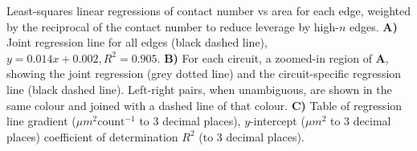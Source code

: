 Least-squares linear regressions of contact number vs area for each edge, weighted by the reciprocal of the contact number to reduce leverage by high-$n$ edges.
\textbf{A)} Joint regression line for all edges (black dashed line), $y = 0.014x + 0.002, R^2 = 0.905$.
\textbf{B)} For each circuit, a zoomed-in region of \textbf{A}, showing the joint regression (grey dotted line) and the circuit-specific regression line (black dashed line).
Left-right pairs, when unambiguous, are shown in the same colour and joined with a dashed line of that colour.
\textbf{C)} Table of regression line gradient ($\mu m^2 \textrm{count}^{-1}$ to 3 decimal places), $y$-intercept ($\mu m^2$ to 3 decimal places) coefficient of determination $R^2$ (to 3 decimal places).